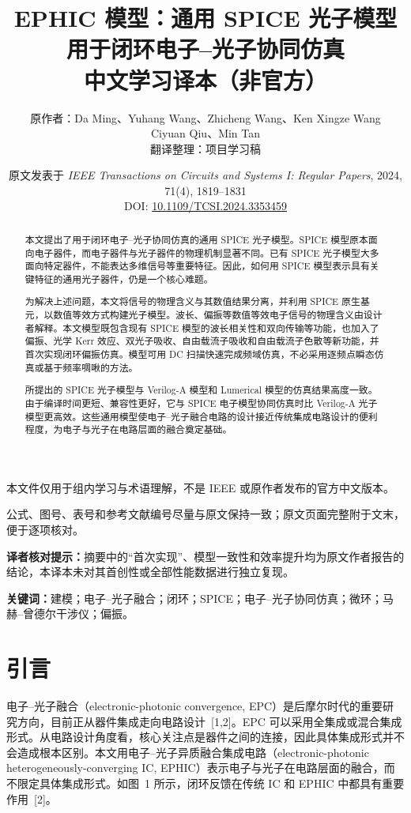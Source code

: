 \documentclass[11pt,a4paper]{ctexart}
\title{EPHIC 模型：通用 SPICE 光子模型\\
用于闭环电子--光子协同仿真\\
\large 中文学习译本（非官方）}
\author{原作者：Da Ming、Yuhang Wang、Zhicheng Wang、Ken Xingze Wang\\
Ciyuan Qiu、Min Tan\\
翻译整理：项目学习稿}
\date{原文发表于 \textit{IEEE Transactions on Circuits and Systems I: Regular Papers}, 2024, 71(4), 1819--1831\\
DOI: \href{https://doi.org/10.1109/TCSI.2024.3353459}{10.1109/TCSI.2024.3353459}}
\newcommand{\transnote}[1]{%
  \par\noindent\colorbox{yellow!16}{%
    \parbox{\dimexpr\linewidth-2\fboxsep}{\textbf{译者核对提示：}#1}}\par}
\begin{document}
\maketitle

\begin{center}
\small
本文件仅用于组内学习与术语理解，不是 IEEE 或原作者发布的官方中文版本。\par
公式、图号、表号和参考文献编号尽量与原文保持一致；原文页面完整附于文末，便于逐项核对。
\end{center}

\tableofcontents
\clearpage

\begin{abstract}
本文提出了用于闭环电子--光子协同仿真的通用 SPICE 光子模型。SPICE 模型原本面向电子器件，而电子器件与光子器件的物理机制显著不同。已有 SPICE 光子模型大多面向特定器件，不能表达多维信号等重要特征。因此，如何用 SPICE 模型表示具有关键特征的通用光子器件，仍是一个核心难题。

为解决上述问题，本文将信号的物理含义与其数值结果分离，并利用 SPICE 原生基元，以数值等效方式构建光子模型。波长、偏振等数值等效电子信号的物理含义由设计者解释。本文模型既包含现有 SPICE 模型的波长相关性和双向传输等功能，也加入了偏振、光学 Kerr 效应、双光子吸收、自由载流子吸收和自由载流子色散等新功能，并首次实现闭环偏振仿真。模型可用 DC 扫描快速完成频域仿真，不必采用逐频点瞬态仿真或基于频率啁啾的方法。

所提出的 SPICE 光子模型与 Verilog-A 模型和 Lumerical 模型的仿真结果高度一致。由于编译时间更短、兼容性更好，它与 SPICE 电子模型协同仿真时比 Verilog-A 光子模型更高效。这些通用模型使电子--光子融合电路的设计接近传统集成电路设计的便利程度，为电子与光子在电路层面的融合奠定基础。
\end{abstract}

\transnote{摘要中的“首次实现”、模型一致性和效率提升均为原文作者报告的结论，本译本未对其首创性或全部性能数据进行独立复现。}

\noindent\textbf{关键词：}建模；电子--光子融合；闭环；SPICE；电子--光子协同仿真；微环；马赫--曾德尔干涉仪；偏振。

\section{引言}

电子--光子融合（electronic-photonic convergence, EPC）是后摩尔时代的重要研究方向，目前正从器件集成走向电路设计~[1,2]。EPC 可以采用全集成或混合集成形式。从电路设计角度看，核心关注点是器件之间的连接，因此具体集成形式并不会造成根本区别。本文用电子--光子异质融合集成电路（electronic-photonic heterogeneously-converging IC, EPHIC）表示电子与光子在电路层面的融合，而不限定具体集成形式。如图~1 所示，闭环反馈在传统 IC 和 EPHIC 中都具有重要作用~[2]。
\end{document}
